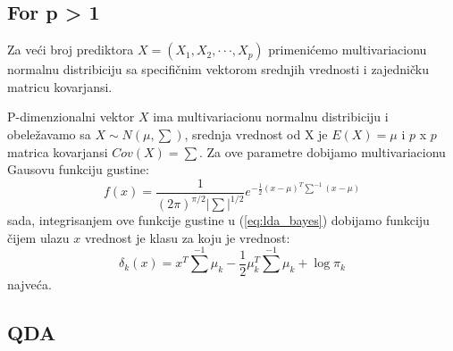 \subsection{For p > 1}

Za veći broj prediktora $X = (X_1, X_2, \cdot\cdot\cdot, X_p)$ primenićemo
multivariacionu normalnu distribiciju sa specifičnim vektorom srednjih vrednosti
i zajedničku matricu kovarjansi.

P-dimenzionalni vektor $X$ ima multivariacionu normalnu distribiciju i obeležavamo
sa $X \sim N(\mu, \sum)$, srednja vrednost od X je $E(X)=\mu$ i $p$ x $p$ matrica
kovarjansi $Cov(X)=\sum$. Za ove parametre dobijamo multivariacionu Gausovu funkciju gustine:
\begin{equation} \label{eq:lda_multi_var_gauss_density}
  f(x) =
  \frac{1}{(2\pi)^{\pi/2}|\sum|^{1/2}}
  e^{-\frac{1}{2}(x-\mu)^T\sum^{-1}(x-\mu)}
\end{equation}
sada, integrisanjem ove funkcije gustine u (\ref{eq:lda_bayes}) dobijamo funkciju
čijem ulazu $x$ vrednost je klasu za koju je vrednost:
\begin{equation} \label{}
  \delta_k\left(x\right) =
    x^T\sum^{-1}\mu_k -\frac{1}{2}\mu_k^T\sum^{-1}\mu_k + \log{\pi_k}
\end{equation}
najveća.

\subsection{QDA}
